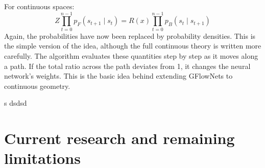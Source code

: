 \documentclass{article}
\begin{document}
For continuous spaces:
\begin{equation}
Z\prod _{t=0}^{n-1}p_{F}(s_{t+1}\mid s_{t})=R(x)\prod _{t=0}^{n-1}p_{B}(s_{t}\mid s_{t+1})
\end{equation}
Again, the probabilities have now been replaced by probability densities. This is the simple version of the idea, although the full continuous theory is written more carefully. The algorithm evaluates these quantities step by step as it moves along a path. If the total ratio across the path deviates from 1, it changes the neural network's weights. This is the basic idea behind extending GFlowNets to continuous geometry.

s dsdsd

\section{Current research and remaining limitations}
\end{document}
